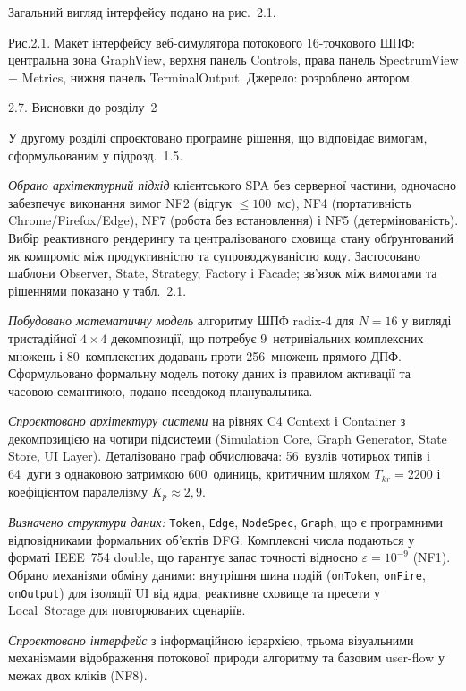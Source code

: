 \documentclass[
]{article}
\begin{document}
Загальний вигляд інтерфейсу подано на рис.~2.1.

Рис.2.1. Макет інтерфейсу веб-симулятора потокового 16-точкового ШПФ:
центральна зона GraphView, верхня панель Controls, права панель
SpectrumView + Metrics, нижня панель TerminalOutput. Джерело: розроблено
автором.

\protect{}\label{_Toc228121478}{}2.7. Висновки до розділу~2

У другому розділі спроєктовано програмне рішення, що відповідає вимогам,
сформульованим у підрозд.~1.5.

\emph{Обрано архітектурний підхід} клієнтського SPA без серверної
частини, одночасно забезпечує виконання вимог NF2 (відгук
\(\leq 100\)~мс), NF4 (портативність Chrome/Firefox/Edge), NF7 (робота
без встановлення) і NF5 (детермінованість). Вибір реактивного рендерингу
та централізованого сховища стану обґрунтований як компроміс між
продуктивністю та супроводжуваністю коду. Застосовано шаблони Observer,
State, Strategy, Factory і Facade; зв'язок між вимогами та рішеннями
показано у табл.~2.1.

\emph{Побудовано математичну модель} алгоритму ШПФ radix-4 для
\(N = 16\) у вигляді тристадійної \(4 \times 4\) декомпозиції, що
потребує 9~нетривіальних комплексних множень і 80~комплексних додавань
проти 256~множень прямого ДПФ. Сформульовано формальну модель потоку
даних із правилом активації та часовою семантикою, подано псевдокод
планувальника.

\emph{Спроєктовано архітектуру системи} на рівнях C4 Context і Container
з декомпозицією на чотири підсистеми (Simulation Core, Graph Generator,
State Store, UI Layer). Деталізовано граф обчислювача: 56~вузлів
чотирьох типів і 64~дуги з однаковою затримкою 600~одиниць, критичним
шляхом \(T_{kr} = 2200\) і коефіцієнтом паралелізму
\(K_{p} \approx 2,9\).

\emph{Визначено структури даних:} \texttt{Token}, \texttt{Edge},
\texttt{NodeSpec}, \texttt{Graph}, що є програмними відповідниками
формальних об'єктів DFG. Комплексні числа подаються у форматі IEEE~754
double, що гарантує запас точності відносно \(\varepsilon = 10^{- 9}\)
(NF1). Обрано механізми обміну даними: внутрішня шина подій
(\texttt{onToken}, \texttt{onFire}, \texttt{onOutput}) для ізоляції UI
від ядра, реактивне сховище та пресети у Local~Storage для повторюваних
сценаріїв.

\emph{Спроєктовано інтерфейс} з інформаційною ієрархією, трьома
візуальними механізмами відображення потокової природи алгоритму та
базовим user-flow у межах двох кліків (NF8).
\end{document}
